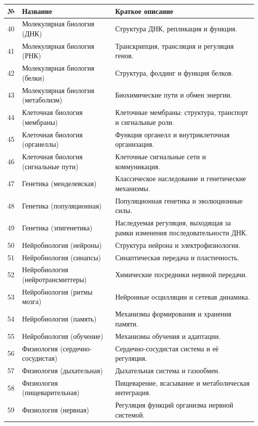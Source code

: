 \documentclass[11pt,a4paper]{article}
\begin{document}
	\begin{longtable}{|p{0.9cm}|p{6.0cm}|p{8.6cm}|}
		\hline
		\textbf{№} & \textbf{Название} & \textbf{Краткое описание} \\
		\hline
		\endhead
		40 & Молекулярная биология (ДНК) & Структура ДНК, репликация и функция. \\
		41 & Молекулярная биология (РНК) & Транскрипция, трансляция и регуляция генов. \\
		42 & Молекулярная биология (белки) & Структура, фолдинг и функция белков. \\
		43 & Молекулярная биология (метаболизм) & Биохимические пути и обмен энергии. \\
		44 & Клеточная биология (мембраны) & Клеточные мембраны: структура, транспорт и сигнальные роли. \\
		45 & Клеточная биология (органеллы) & Функция органелл и внутриклеточная организация. \\
		46 & Клеточная биология (сигнальные пути) & Клеточные сигнальные сети и коммуникация. \\
		47 & Генетика (менделевская) & Классическое наследование и генетические механизмы. \\
		48 & Генетика (популяционная) & Популяционная генетика и эволюционные силы. \\
		49 & Генетика (эпигенетика) & Наследуемая регуляция, выходящая за рамки изменения последовательности ДНК. \\
		50 & Нейробиология (нейроны) & Структура нейрона и электрофизиология. \\
		51 & Нейробиология (синапсы) & Синаптическая передача и пластичность. \\
		52 & Нейробиология (нейротрансмиттеры) & Химические посредники нервной передачи. \\
		53 & Нейробиология (ритмы мозга) & Нейронные осцилляции и сетевая динамика. \\
		54 & Нейробиология (память) & Механизмы формирования и хранения памяти. \\
		55 & Нейробиология (обучение) & Механизмы обучения и адаптации. \\
		56 & Физиология (сердечно-сосудистая) & Сердечно-сосудистая система и её регуляция. \\
		57 & Физиология (дыхательная) & Дыхательная система и газообмен. \\
		58 & Физиология (пищеварительная) & Пищеварение, всасывание и метаболическая интеграция. \\
		59 & Физиология (нервная) & Регуляция функций организма нервной системой. \\

\end{longtable}
\end{document}
